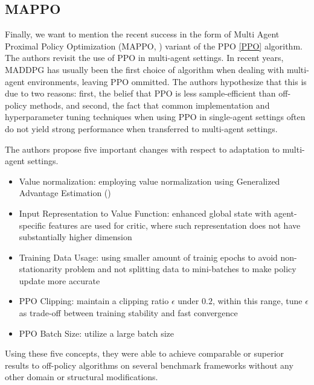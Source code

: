 \subsection*{MAPPO}
Finally, we want to mention the recent success in the form of Multi Agent Proximal Policy Optimization (MAPPO, \cite{MAPPO}) variant of the PPO \ref{PPO} algorithm.
The authors revisit the use of PPO in multi-agent settings.
In recent years, MADDPG has usually been the first choice of algorithm when dealing with multi-agent environments, leaving PPO ommitted.
The authors hypothesize that this is due to two reasons: first, the belief that PPO is less sample-efficient than off-policy methods, and second, the fact that common implementation and hyperparameter tuning techniques when using PPO in single-agent settings often do not yield strong performance when transferred to multi-agent settings.

The authors propose five important changes with respect to adaptation to multi-agent settings.
\begin{itemize}
    \item Value normalization: \newline 
    employing value normalization using Generalized Advantage Estimation (\cite{GAE}) 
    
    \item Input Representation to Value Function: \newline 
    enhanced global state with agent-specific features are used for critic, where such representation does not have substantially higher dimension

    \item Training Data Usage: \newline
    using smaller amount of trainig epochs to avoid non-stationarity problem and not splitting data to mini-batches to make policy update more accurate

    \item PPO Clipping: \newline
    maintain a clipping ratio $\epsilon$ under $0.2$, within this range, tune $\epsilon$ as trade-off between training stability and fast convergence

    \item PPO Batch Size: \newline
    utilize a large batch size
\end{itemize}

Using these five concepts, they were able to achieve comparable or superior results to off-policy algorithms on several benchmark frameworks without any other domain or structural modifications.





